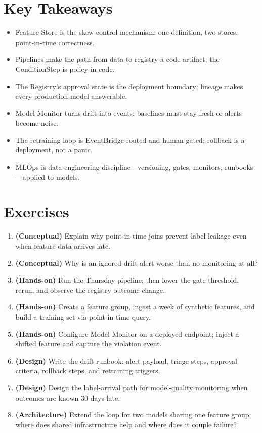 \section*{Key Takeaways}
\begin{itemize}
    \item Feature Store is the skew-control mechanism: one definition, two stores, point-in-time correctness.
    \item Pipelines make the path from data to registry a code artifact; the ConditionStep is policy in code.
    \item The Registry's approval state is the deployment boundary; lineage makes every production model answerable.
    \item Model Monitor turns drift into events; baselines must stay fresh or alerts become noise.
    \item The retraining loop is EventBridge-routed and human-gated; rollback is a deployment, not a panic.
    \item MLOps is data-engineering discipline---versioning, gates, monitors, runbooks---applied to models.
\end{itemize}

\section{Exercises}
\begin{enumerate}
    \item \textbf{(Conceptual)} Explain why point-in-time joins prevent label leakage even when feature data arrives late.
    \item \textbf{(Conceptual)} Why is an ignored drift alert worse than no monitoring at all?
    \item \textbf{(Hands-on)} Run the Thursday pipeline; then lower the gate threshold, rerun, and observe the registry outcome change.
    \item \textbf{(Hands-on)} Create a feature group, ingest a week of synthetic features, and build a training set via point-in-time query.
    \item \textbf{(Hands-on)} Configure Model Monitor on a deployed endpoint; inject a shifted feature and capture the violation event.
    \item \textbf{(Design)} Write the drift runbook: alert payload, triage steps, approval criteria, rollback steps, and retraining triggers.
    \item \textbf{(Design)} Design the label-arrival path for model-quality monitoring when outcomes are known 30 days late.
    \item \textbf{(Architecture)} Extend the loop for two models sharing one feature group; where does shared infrastructure help and where does it couple failure?
\end{enumerate}


